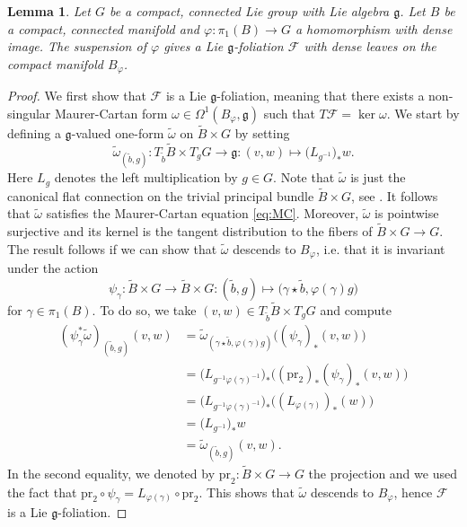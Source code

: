 \documentclass[11pt, letterpaper, oneside,reqno]{amsart}
\theoremstyle{plain}
\newtheorem{lemma}[thm]{Lemma}
\theoremstyle{underline}
\theoremstyle{definition}
\theoremstyle{remark}
\begin{document}
	\begin{lemma}\label{lem:Lie-fol}
		Let $G$ be a compact, connected Lie group with Lie algebra $\mathfrak{g}$. Let $B$ be a compact, connected manifold and $\varphi:\pi_1(B)\rightarrow G$ a homomorphism with dense image. The suspension of $\varphi$ gives a Lie $\mathfrak{g}$-foliation $\mathcal{F}$ with dense leaves on the compact manifold $B_{\varphi}$.
	\end{lemma}
	\begin{proof}
		 We first show that $\mathcal{F}$ is a Lie $\mathfrak{g}$-foliation, meaning that there exists a non-singular Maurer-Cartan form $\omega\in\Omega^{1}(B_{\varphi},\mathfrak{g})$ such that $T\mathcal{F}=\ker\omega$. We start by defining a $\mathfrak{g}$-valued one-form $\widetilde{\omega}$ on $\widetilde{B}\times G$ by setting
		\[
		\widetilde{\omega}_{(\tilde{b},g)}:T_{\tilde{b}}\widetilde{B}\times T_{g}G\rightarrow\mathfrak{g}:(v,w)\mapsto \big(L_{g^{-1}}\big)_{*}w.
		\]
		Here $L_{g}$ denotes the left multiplication by $g\in G$. Note that $\widetilde{\omega}$ is just the canonical flat connection on the trivial principal bundle $\widetilde{B}\times G$, see \cite[Ex.~4.13]{Moerdijk}. It follows that $\widetilde{\omega}$ satisfies the Maurer-Cartan equation \eqref{eq:MC}. Moreover, $\widetilde{\omega}$ is pointwise surjective and its kernel is the tangent distribution to the fibers of $\widetilde{B}\times G\rightarrow G$. The result follows if we can show that $\widetilde{\omega}$ descends to $B_{\varphi}$, i.e. that it is invariant under the action
		\[
		\psi_{\gamma}:\widetilde{B}\times G\rightarrow \widetilde{B}\times G:(\tilde{b},g)\mapsto \big(\gamma\star\tilde{b},\varphi(\gamma)g\big)
		\]
		for $\gamma\in\pi_1(B)$. To do so, we take $(v,w)\in T_{\tilde{b}}\widetilde{B}\times T_{g}G$ and compute
		\begin{align*}
			\left(\psi_{\gamma}^{*}\widetilde{\omega}\right)_{(\tilde{b},g)}(v,w)&=\widetilde{\omega}_{(\gamma\star\tilde{b},\varphi(\gamma)g)}\big((\psi_{\gamma})_{*}(v,w)\big)\\
			&=\big(L_{g^{-1}\varphi(\gamma)^{-1}}\big)_{*}\big((\text{pr}_{2})_{*}(\psi_{\gamma})_{*}(v,w)\big)\\
			&=\big(L_{g^{-1}\varphi(\gamma)^{-1}}\big)_{*}\big((L_{\varphi(\gamma)})_{*}(w)\big)\\
			&=\big(L_{g^{-1}}\big)_{*}w\\
			&=\widetilde{\omega}_{(\tilde{b},g)}(v,w).
		\end{align*}
		In the second equality, we denoted by $\text{pr}_{2}:\widetilde{B}\times G\rightarrow G$ the projection and we used the fact that $\text{pr}_{2}\circ\psi_{\gamma}=L_{\varphi(\gamma)}\circ\text{pr}_{2}$. This shows that $\widetilde{\omega}$ descends to $B_{\varphi}$, hence $\mathcal{F}$ is a Lie $\mathfrak{g}$-foliation.
		

\end{proof}
\end{document}
